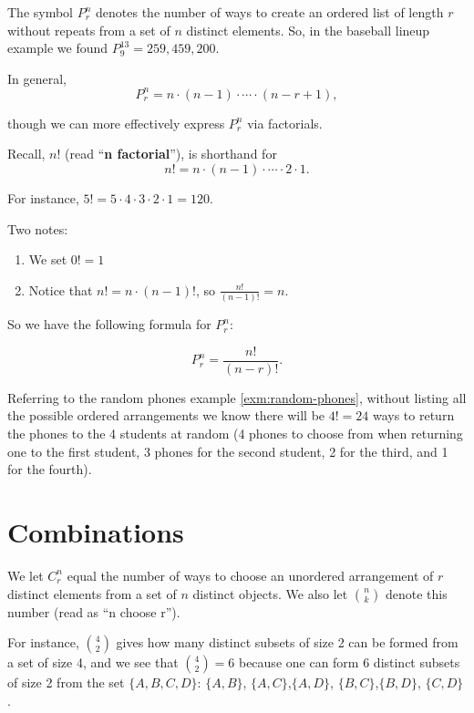 \documentclass[
]{book}
\providecommand{\tightlist}{%
  \setlength{\itemsep}{0pt}\setlength{\parskip}{0pt}}
\theoremstyle{definition}
\theoremstyle{definition}
\theoremstyle{definition}
\theoremstyle{definition}
\theoremstyle{remark}
\begin{document}
The symbol \(\displaystyle P^n_r\) denotes the number of ways to create an ordered list of length \(r\) without repeats from a set of \(n\) distinct elements. So, in the baseball lineup example we found \(\displaystyle P^{13}_9 = 259,459,200.\)

In general, \[P^n_r = n \cdot (n-1) \cdot \cdots \cdot (n-r+1),\]

though we can more effectively express \(\displaystyle P^n_r\) via factorials.

Recall, \(n!\) (read ``\textbf{n factorial}''), is shorthand for \[n! = n \cdot (n-1) \cdot \cdots \cdot 2 \cdot 1.\]

For instance, \(5! = 5 \cdot 4 \cdot 3 \cdot 2 \cdot 1 = 120\).

Two notes:

\begin{enumerate}
\def\labelenumi{\arabic{enumi}.}
\tightlist
\item
  We set \(0! = 1\)
\item
  Notice that \(n! = n \cdot (n-1)!\), so \(\displaystyle \frac{n!}{(n-1)!} = n\).
\end{enumerate}

So we have the following formula for \(\displaystyle P^n_r\):

\begin{equation} 
  P^n_r = \frac{n!}{(n-r)!}.
  \label{eq:Pnr}
\end{equation}

Referring to the random phones example \ref{exm:random-phones}, without listing all the possible ordered arrangements we know there will be \(4!= 24\) ways to return the phones to the 4 students at random (4 phones to choose from when returning one to the first student, 3 phones for the second student, 2 for the third, and 1 for the fourth).

\section{Combinations}\label{combinations}

We let \(\displaystyle C^n_r\) equal the number of ways to choose an unordered arrangement of \(r\) distinct elements from a set of \(n\) distinct objects. We also let \(\displaystyle\binom{n}{k}\) denote this number (read as ``n choose r'').

For instance, \(\displaystyle\binom{4}{2}\) gives how many distinct subsets of size 2 can be formed from a set of size 4, and we see that \(\displaystyle\binom{4}{2} = 6\) because one can form 6 distinct subsets of size 2 from the set \(\{A,B,C,D\}\): \(\{A,B\}\), \(\{A,C\}\),\(\{A,D\}\), \(\{B,C\}\),\(\{B,D\}\), \(\{C,D\}\).
\end{document}
